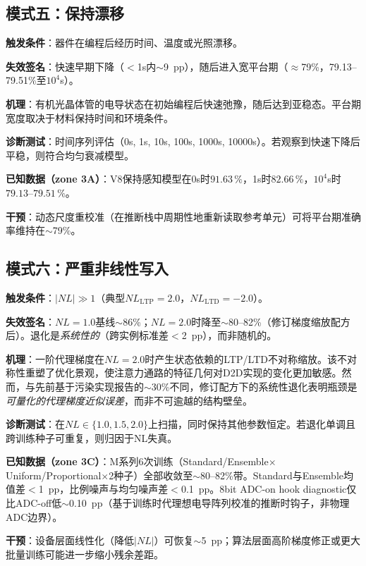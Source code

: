 \subsection{模式五：保持漂移}
\label{subsec:failure_retention}

\textbf{触发条件}：器件在编程后经历时间、温度或光照漂移。

\textbf{失效签名}：快速早期下降（$<$1s内$\sim$9~pp），随后进入宽平台期（$\approx$79\%，79.13--79.51\%至$10^4$s）。

\textbf{机理}：有机光晶体管的电导状态在初始编程后快速弛豫，随后达到亚稳态。平台期宽度取决于材料保持时间和环境条件。

\textbf{诊断测试}：时间序列评估（0s, 1s, 10s, 100s, 1000s, 10000s）。若观察到快速下降后平稳，则符合均匀衰减模型。

\textbf{已知数据（zone 3A）}：V8保持感知模型在0s时$91.63\,\%$，1s时$82.66\,\%$，$10^4$s时$79.13$--$79.51\,\%$。

\textbf{干预}：动态尺度重校准（在推断栈中周期性地重新读取参考单元）可将平台期准确率维持在$\sim$79\%。

\subsection{模式六：严重非线性写入}
\label{subsec:failure_severe_nl}

\textbf{触发条件}：$|NL|\gg1$（典型$NL_{\mathrm{LTP}}=2.0$，$NL_{\mathrm{LTD}}=-2.0$）。

\textbf{失效签名}：$NL=1.0$基线$\sim$86\%；$NL=2.0$时降至$\sim$80--82\%（修订梯度缩放配方后）。退化是\emph{系统性的}（跨实例标准差$<$2~pp），而非随机的。

\textbf{机理}：一阶代理梯度在$NL=2.0$时产生状态依赖的LTP/LTD不对称缩放。该不对称性重塑了优化景观，使注意力通路的特征几何对D2D实现的变化更加敏感。然而，与先前基于污染实现报告的$\sim$30\%不同，修订配方下的系统性退化表明瓶颈是\emph{可量化的代理梯度近似误差}，而非不可逾越的结构壁垒。

\textbf{诊断测试}：在$NL\in\{1.0, 1.5, 2.0\}$上扫描，同时保持其他参数恒定。若退化单调且跨训练种子可重复，则归因于NL失真。

\textbf{已知数据（zone 3C）}：M系列6次训练（Standard/Ensemble$\times$Uniform/Proportional$\times$2种子）全部收敛至$\sim$80--82\%带。Standard与Ensemble均值差$<$1~pp，比例噪声与均匀噪声差$<$0.1~pp。8bit ADC-on hook diagnostic仅比ADC-off低$\sim$0.10~pp（基于训练时代理想电导阵列校准的推断时钩子，非物理ADC边界）。

\textbf{干预}：设备层面线性化（降低$|NL|$）可恢复$\sim$5~pp；算法层面高阶梯度修正或更大批量训练可能进一步缩小残余差距。

